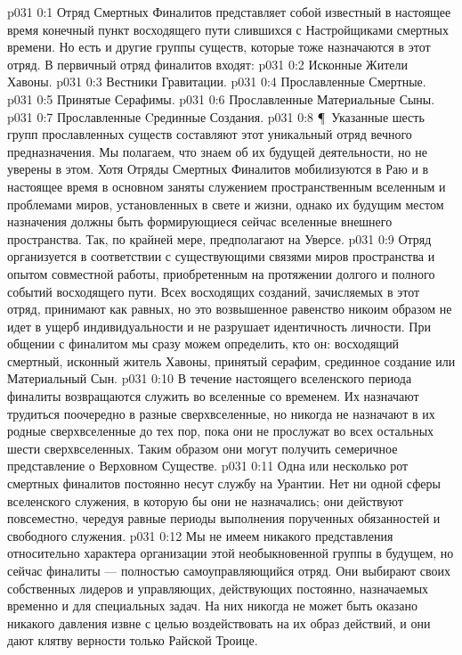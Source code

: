 \author{Божественный Советник и Не Имеющий Имени и Номера}
\vs p031 0:1 Отряд Смертных Финалитов представляет собой известный в настоящее время конечный пункт восходящего пути слившихся с Настройщиками смертных времени. Но есть и другие группы существ, которые тоже назначаются в этот отряд. В первичный отряд финалитов входят:
\vs p031 0:2 \bibnobreakspace Исконные Жители Хавоны.
\vs p031 0:3 \bibnobreakspace Вестники Гравитации.
\vs p031 0:4 \bibnobreakspace Прославленные Смертные.
\vs p031 0:5 \bibnobreakspace Принятые Серафимы.
\vs p031 0:6 \bibnobreakspace Прославленные Материальные Сыны.
\vs p031 0:7 \bibnobreakspace Прославленные Cрединные Создания.
\vs p031 0:8 \P\ Указанные шесть групп прославленных существ составляют этот уникальный отряд вечного предназначения. Мы полагаем, что знаем об их будущей деятельности, но не уверены в этом. Хотя Отряды Смертных Финалитов мобилизуются в Раю и в настоящее время в основном заняты служением пространственным вселенным и проблемами миров, установленных в свете и жизни, однако их будущим местом назначения должны быть формирующиеся сейчас вселенные внешнего пространства. Так, по крайней мере, предполагают на Уверсе.
\vs p031 0:9 Отряд организуется в соответствии с существующими связями миров пространства и опытом совместной работы, приобретенным на протяжении долгого и полного событий восходящего пути. Всех восходящих созданий, зачисляемых в этот отряд, принимают как равных, но это возвышенное равенство никоим образом не идет в ущерб индивидуальности и не разрушает идентичность личности. При общении с финалитом мы сразу можем определить, кто он: восходящий смертный, исконный житель Хавоны, принятый серафим, срединное создание или Материальный Сын.
\vs p031 0:10 В течение настоящего вселенского периода финалиты возвращаются служить во вселенные со временем. Их назначают трудиться поочередно в разные сверхвселенные, но никогда не назначают в их родные сверхвселенные до тех пор, пока они не прослужат во всех остальных шести сверхвселенных. Таким образом они могут получить семеричное представление о Верховном Существе.
\vs p031 0:11 Одна или несколько рот смертных финалитов постоянно несут службу на Урантии. Нет ни одной сферы вселенского служения, в которую бы они не назначались; они действуют повсеместно, чередуя равные периоды выполнения порученных обязанностей и свободного служения.
\vs p031 0:12 Мы не имеем никакого представления относительно характера организации этой необыкновенной группы в будущем, но сейчас финалиты --- полностью самоуправляющийся отряд. Они выбирают своих собственных лидеров и управляющих, действующих постоянно, назначаемых временно и для специальных задач. На них никогда не может быть оказано никакого давления извне с целью воздействовать на их образ действий, и они дают клятву верности только Райской Троице.
